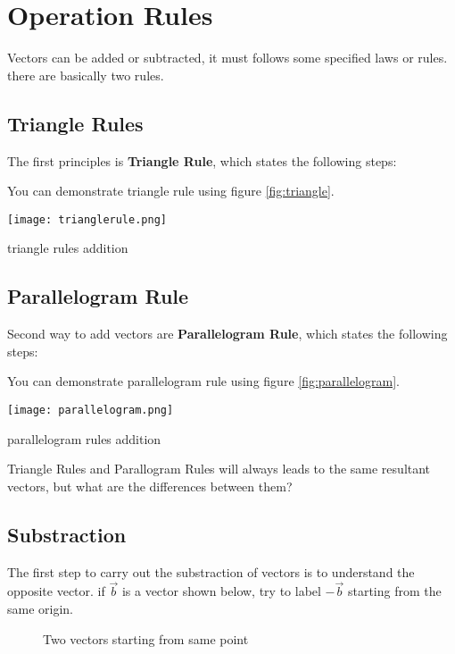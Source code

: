 \documentclass[a4paper]{tufte-handout}
\newenvironment{SummBox}
{\begin{tcolorbox}[breakable,colback=r1!30,colframe=r1,title=Summary]} {\end{tcolorbox}}
\begin{document}
\section{Operation Rules}
Vectors can be added or subtracted, it must follows some specified laws or rules. there are basically two rules.
\subsection{Triangle Rules}
The first principles is \textbf{Triangle Rule}, which states the following steps:\\
\uline{\hspace{3.5 in}}

You can demonstrate triangle rule using figure \ref{fig:triangle}.
\begin{marginfigure}
	\texttt{[image: trianglerule.png]}
	\caption{triangle rules addition}
	\label{fig:triangle}
\end{marginfigure}

\subsection*{Parallelogram Rule}
Second way to add vectors are \textbf{Parallelogram Rule}, which states the following steps:\\
\uline{\hspace{3.5 in}}

You can demonstrate parallelogram rule using figure \ref{fig:parallelogram}.
\begin{marginfigure}
	\texttt{[image: parallelogram.png]}
	\caption{parallelogram rules addition}
	\label{fig:parallelogram}
\end{marginfigure}

\begin{SummBox}
Triangle Rules and Parallogram Rules will always leads to the same resultant vectors, but what are the differences between them?
\end{SummBox}

\subsection*{Substraction}
The first step to carry out the substraction of vectors is to understand the opposite vector.
if $\vec{b}$ is a vector shown below, try to label $-\vec{b}$ starting from the same origin.\\
\vspace{1in}
\begin{figure}
\centering
{}
\caption{Two vectors starting from same point}
\label{fig:two vectors}
\end{figure}
\vspace{1in}
\end{document}
